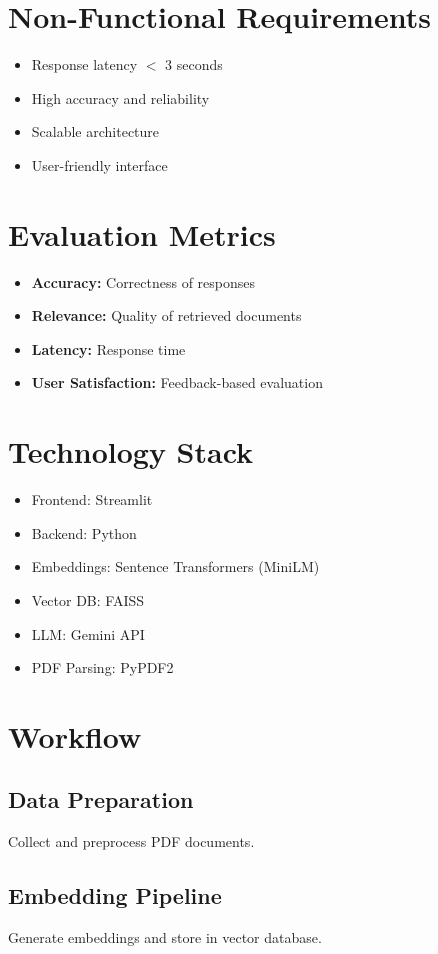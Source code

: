 \documentclass[11pt]{article}
\begin{document}
\section{Non-Functional Requirements}
\begin{itemize}
    \item Response latency $<$ 3 seconds
    \item High accuracy and reliability
    \item Scalable architecture
    \item User-friendly interface
\end{itemize}

\section{Evaluation Metrics}
\begin{itemize}
    \item \textbf{Accuracy:} Correctness of responses
    \item \textbf{Relevance:} Quality of retrieved documents
    \item \textbf{Latency:} Response time
    \item \textbf{User Satisfaction:} Feedback-based evaluation
\end{itemize}

\section{Technology Stack}
\begin{itemize}
    \item Frontend: Streamlit
    \item Backend: Python
    \item Embeddings: Sentence Transformers (MiniLM)
    \item Vector DB: FAISS
    \item LLM: Gemini API
    \item PDF Parsing: PyPDF2
\end{itemize}

\section{Workflow}
\subsection{Data Preparation}
Collect and preprocess PDF documents.

\subsection{Embedding Pipeline}
Generate embeddings and store in vector database.
\end{document}

